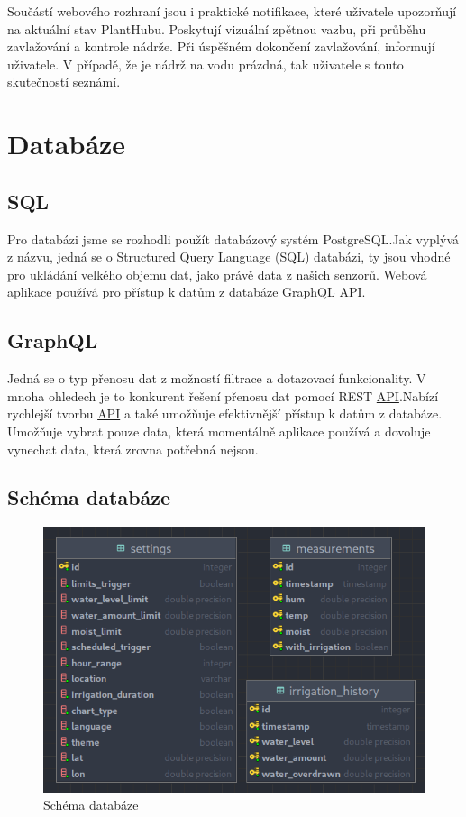 \documentclass[czech,12pt,a4paper]{article}
\begin{document}
Součástí webového rozhraní jsou i praktické notifikace, které uživatele upozorňují na aktuální stav PlantHubu. Poskytují vizuální zpětnou vazbu, při průběhu zavlažování a kontrole nádrže. Při úspěšném dokončení zavlažování, informují uživatele. V případě, že je nádrž na vodu prázdná, tak uživatele s touto skutečností seznámí.

\section{Databáze}

\subsection{SQL}

Pro databázi jsme se rozhodli použít databázový systém PostgreSQL.\@ Jak vyplývá z názvu, jedná se o Structured Query Language (SQL) databázi, ty jsou vhodné pro ukládání velkého objemu dat, jako právě data z našich senzorů. Webová aplikace používá pro přístup k datům z databáze \ac{GraphQL} \space \underline{\ac{API}}.\@

\subsection{GraphQL}

Jedná se o typ přenosu dat z možností filtrace a dotazovací funkcionality. V mnoha ohledech je to konkurent řešení přenosu dat pomocí \ac{REST} \space \underline{\ac{API}}.\@ Nabízí rychlejší tvorbu \underline{\ac{API}} \space a také umožňuje efektivnější přístup k datům z databáze. Umožňuje vybrat pouze data, která momentálně aplikace používá a dovoluje vynechat data, která zrovna potřebná nejsou.

\clearpage

\subsection{Schéma databáze}

\begin{figure}[h]
	\centering
	\includegraphics[width=0.9\linewidth]{db.png}
	\caption{Schéma databáze}
\end{figure}
\end{document}
